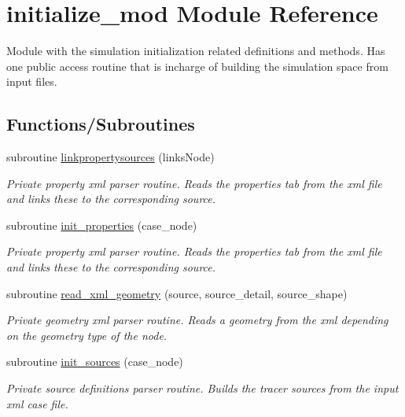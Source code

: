 \hypertarget{namespaceinitialize__mod}{}\section{initialize\+\_\+mod Module Reference}
\label{namespaceinitialize__mod}


Module with the simulation initialization related definitions and methods. Has one public access routine that is incharge of building the simulation space from input files.  


\subsection*{Functions/\+Subroutines}
\begin{DoxyCompactItemize}
\item 
subroutine \mbox{\hyperlink{namespaceinitialize__mod_af38ade977df8d56db1d125bc4cc03a4a}{linkpropertysources}} (links\+Node)
\begin{DoxyCompactList}\small\item\em Private property xml parser routine. Reads the properties tab from the xml file and links these to the corresponding source. \end{DoxyCompactList}\item 
subroutine \mbox{\hyperlink{namespaceinitialize__mod_a4c7a93dca8bb7b573e91f877033ab22a}{init\+\_\+properties}} (case\+\_\+node)
\begin{DoxyCompactList}\small\item\em Private property xml parser routine. Reads the properties tab from the xml file and links these to the corresponding source. \end{DoxyCompactList}\item 
subroutine \mbox{\hyperlink{namespaceinitialize__mod_aebe8236f74bc6665b16463683c478602}{read\+\_\+xml\+\_\+geometry}} (source, source\+\_\+detail, source\+\_\+shape)
\begin{DoxyCompactList}\small\item\em Private geometry xml parser routine. Reads a geometry from the xml depending on the geometry type of the node. \end{DoxyCompactList}\item 
subroutine \mbox{\hyperlink{namespaceinitialize__mod_aae6a35bca190cdf65a6146f254264cd1}{init\+\_\+sources}} (case\+\_\+node)
\begin{DoxyCompactList}\small\item\em Private source definitions parser routine. Builds the tracer sources from the input xml case file. \end{DoxyCompactList}\item 

\end{DoxyCompactItemize}
